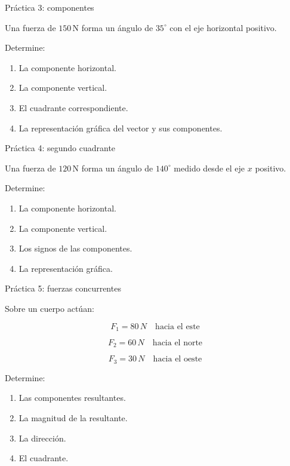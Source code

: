 \documentclass[aspectratio=169,11pt]{beamer}
\begin{document}
\begin{frame}{Práctica 3: componentes}

Una fuerza de \(150\,\mathrm{N}\)
forma un ángulo de \(35^\circ\)
con el eje horizontal positivo.

Determine:

\begin{enumerate}
\item La componente horizontal.
\item La componente vertical.
\item El cuadrante correspondiente.
\item La representación gráfica
del vector y sus componentes.
\end{enumerate}

\end{frame}

\begin{frame}{Práctica 4: segundo cuadrante}

Una fuerza de \(120\,\mathrm{N}\)
forma un ángulo de \(140^\circ\)
medido desde el eje \(x\) positivo.

Determine:

\begin{enumerate}
\item La componente horizontal.
\item La componente vertical.
\item Los signos de las componentes.
\item La representación gráfica.
\end{enumerate}

\end{frame}

\begin{frame}{Práctica 5: fuerzas concurrentes}

Sobre un cuerpo actúan:

\[
F_1=80\,N
\quad\text{hacia el este}
\]

\[
F_2=60\,N
\quad\text{hacia el norte}
\]

\[
F_3=30\,N
\quad\text{hacia el oeste}
\]

Determine:

\begin{enumerate}
\item Las componentes resultantes.
\item La magnitud de la resultante.
\item La dirección.
\item El cuadrante.
\end{enumerate}

\end{frame}
\end{document}
